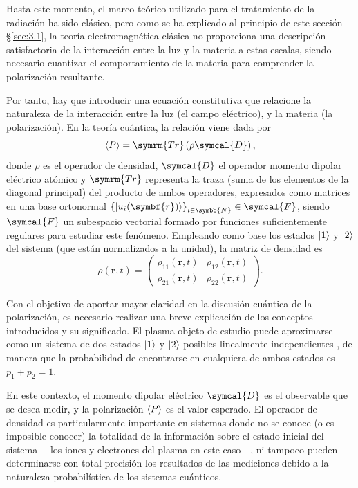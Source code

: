 Hasta este momento, el marco teórico utilizado para el tratamiento de la radiación ha sido clásico, pero como se ha explicado al principio de este sección \S\ref{sec:3.1}, la teoría electromagnética clásica no proporciona una descripción satisfactoria \autocite{griffithsIntroductionElectrodynamics2017} de la interacción entre la luz y la materia a estas escalas, siendo necesario cuantizar el comportamiento de la materia para comprender la polarización resultante.

Por tanto, hay que introducir una ecuación constitutiva que relacione la naturaleza de la interacción entre la luz (el campo eléctrico), y la materia (la polarización). En la teoría cuántica, la relación \autocite{cohen-tannoudjiQuantumMechanicsVolume2019} viene dada por
\begin{equation}\label{eq:3.9}
  \xval{P} = \symrm{Tr} \left(\rho \symcal{D} \right),
\end{equation}
donde $\rho$ es el operador de densidad, $\symcal{D}$ el operador momento dipolar eléctrico atómico y $\symrm{Tr}$ representa la traza (suma de los elementos de la diagonal principal) del producto de ambos operadores, expresados como matrices en una base ortonormal $\left\{\ket{u_{i}(\symbf{r})}\right\}_{i \in \symbb{N}} \in \symcal{F}$, siendo $\symcal{F}$ un subespacio vectorial \autocite{cohen-tannoudjiQuantumMechanicsVolume2019} formado por funciones suficientemente regulares para estudiar este fenómeno. Empleando como base los estados $\left|1\right\rangle$ y $\left|2\right\rangle$ del sistema (que están normalizados a la unidad), la matriz de densidad es
\begin{equation}\label{eq:3.10}
  \rho(\symbf{r},t) = 
  \begin{pmatrix}
    \rho_{11}(\symbf{r},t) & \rho_{12}(\symbf{r},t) \\
    \rho_{21}(\symbf{r},t) & \rho_{22}(\symbf{r},t)
  \end{pmatrix}.
\end{equation}

Con el objetivo de aportar mayor claridad en la discusión cuántica de la polarización, es necesario realizar una breve explicación de los conceptos introducidos y su significado. El plasma objeto de estudio puede aproximarse \autocite{milonniLasers1988} como un sistema de dos estados $\left|1\right\rangle$ y $\left|2\right\rangle$ posibles linealmente independientes \autocite{cohen-tannoudjiQuantumMechanicsVolume2019}, de manera que la probabilidad de encontrarse en cualquiera de ambos estados es $p_{1} + p_{2} = 1$.

En este contexto, el momento dipolar eléctrico $\symcal{D}$ es el observable que se desea medir, y la polarización $\left\langle P\right\rangle$ es el valor esperado. El operador de densidad es particularmente importante en sistemas donde no se conoce (o es imposible conocer) la totalidad de la información sobre el estado inicial del sistema ---los iones y electrones del plasma en este caso---, ni tampoco pueden determinarse con total precisión los resultados de las mediciones debido a la naturaleza probabilística de los sistemas cuánticos. 

